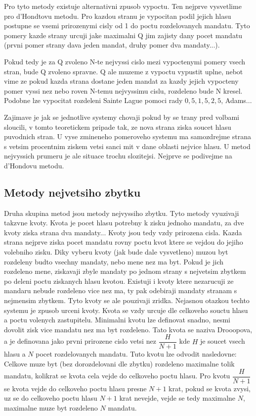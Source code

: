 \documentclass[12pt,a4paper]{report}
\begin{document}
Pro tyto metody existuje alternativni zpusob vypoctu.
Ten nejprve vysvetlime pro d'Hondtovu metodu.
Pro kazdou stranu je vypocitan podil jejich hlasu postupne se vsemi prirozenymi cisly od 1 do poctu rozdelovanych mandatu.
Tyto pomery kazde strany urcuji jake maximalni Q jim zajisty dany pocet mandatu (prvni pomer strany dava jeden mandat, druhy pomer dva mandaty...).

Pokud tedy je za Q zvoleno N-te nejvyssi cislo mezi vypoctenymi pomery vsech stran, bude Q zvoleno spravne.
Q ale muzeme z vypoctu vypustit uplne, nebot vime ze pokud kazda strana dostane jeden mandat za kazdy jejich vypocteny pomer vyssi nez nebo roven N-temu nejvyssimu cislu, rozdeleno bude N kresel.
Podobne lze vypocitat rozdeleni Sainte Lague pomoci rady $0{,}5, 1{,}5, 2{,}5$, Adams... %

Zajimave je jak se jednotlive systemy chovaji pokud by se trany pred volbami sloucili, v tomto teoretickem pripade tak, ze nova strana ziska soucet hlasu puvodnich stran.
U vyse zmineneho pomeroveho systemu ma samozdrejme strana s vetsim procentnim ziskem vetsi sanci mit v dane oblasti nejvice hlasu.
U metod nejvyssich prumeru je ale situace trochu slozitejsi.
Nejprve se podivejme na d'Hondovu metodu.




\subsection{Metody nejvetsiho zbytku}
Druha skupina metod jsou metody nejvyssiho zbytku.
Tyto metody vyuzivaji takzvne kvoty.
Kvota je pocet hlasu potrebny k zisku jednoho mandatu, za dve kvoty ziska strana dva mandaty...
Kvoty jsou tedy vzdy prirozena cisla.
Kazda strana nejprve ziska pocet mandatu rovny poctu kvot ktere se vejdou do jejiho volebniho zisku.
Diky vyberu kvoty (jak bude dale vysvetleno) muzou byt rozdeleny budto vsechny mandaty, nebo mene nez ma byt.
Pokud je jich rozdeleno mene, ziskavaji zbyle mandaty po jednom strany s nejvetsim zbytkem po deleni poctu ziskanych hlasu kvotou.
Existuji i kvoty ktere nezarucuji ze mandaru nebude rozdeleno vice nez ma, ty pak odebiraji mandaty stranam s nejmensim zbytkem.
Tyto kvoty se ale pouzivaji zridka.
Nejasnou otazkou techto systemu je zpusob urceni kvoty.
Kvota se vzdy urcuje dle celkoveho souctu hlasu a poctu volenych zastupitelu.
Minimalni kvotu lze definovat snadno, nesmi dovolit zisk vice mandatu nez ma byt rozdeleno.
Tato kvota se naziva Drooopova, a je definovana jako prvni prirozene cislo vetsi nez $\dfrac{H}{N+1}$ kde $H$ je soucet vsech hlasu a $N$ pocet rozdelovanych mandatu.
Tuto kvotu lze odvodit nasledovne: Celkove muze byt (bez dorozdelovani dle zbytku) rozdeleno maximalne tolik mandatu, kolikrat se kvota cela vejde do celkoveho poctu hlasu.
Pro kvotu $\dfrac{H}{N+1}$ se kvota vejde do celkoveho poctu hlasu presne $N+1$ krat, pokud se kvota zvysi, uz se do celkoveho poctu hlasu $N+1$ krat nevejde, vejde se tedy maximalne $N$, maximalne muze byt rozdeleno $N$ mandatu.
\end{document}
